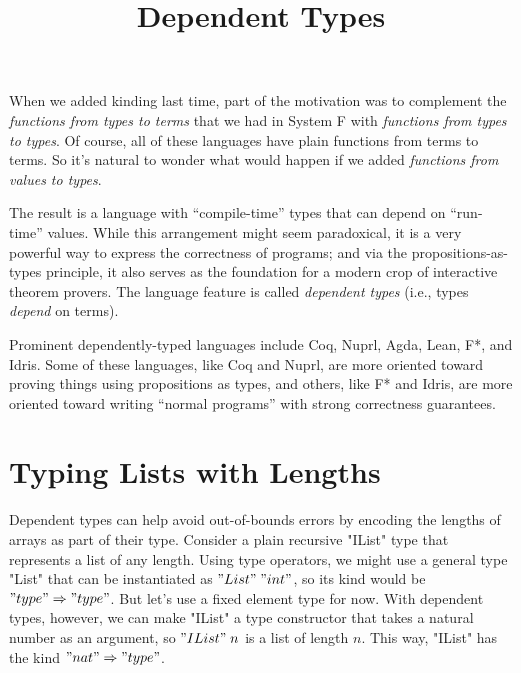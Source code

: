 \title{Dependent Types}
\maketitle

When we added kinding last time, part of the motivation was to complement the
\emph{functions from types to terms} that we had in System F with
\emph{functions from types to types}.
Of course, all of these languages have plain functions from terms to terms.
So it's natural to wonder what would happen if we added \emph{functions from
values to types}.

The result is a language with ``compile-time'' types that can depend on
``run-time'' values.
While this arrangement might seem paradoxical, it is a very powerful way to
express the correctness of programs; and via the propositions-as-types
principle, it also serves as the foundation for a modern crop of interactive
theorem provers.
The language feature is called \emph{dependent types} (i.e., types
\emph{depend} on terms).

Prominent dependently-typed languages include Coq, Nuprl, Agda, Lean, F*, and
Idris.
Some of these languages, like Coq and Nuprl, are more oriented toward proving
things using propositions as types, and others, like F* and Idris, are more
oriented toward writing ``normal programs'' with strong correctness
guarantees.


\section{Typing Lists with Lengths}

Dependent types can help avoid out-of-bounds errors by encoding the lengths of
arrays as part of their type.
Consider a plain recursive "IList" type that represents a list of any length.
Using type operators, we might use a general type "List" that can be
instantiated as $"List" \; "int"$, so its kind would be $"type" \Rightarrow "type"$.
But let's use a fixed element type for now.
With dependent types, however, we can make "IList" a type constructor that
takes a natural number as an argument, so $"IList" \; n$ is a list of length
$n$.
This way, "IList" has the kind $"nat" \Rightarrow "type"$.

